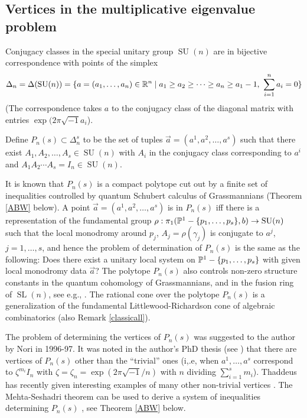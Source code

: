 \documentclass[11pt]{amsart}
\numberwithin{theorem}{subsection}
\begin{document}
\subsection{Vertices in the multiplicative eigenvalue problem}\label{partita}
 Conjugacy classes in the special unitary group $\operatorname{SU}(n)$ are in bijective correspondence with points of the simplex
\begin{equation}\label{defD}
\Delta_n=\Delta(\operatorname{SU}(n))=\{{a}=(a_1,\dots,a_n)\in \Bbb{R}^n\mid  a_1\geq a_2\geq\dots \geq a_n\geq a_1-1,\  \sum_{i=1}^n a_i=0\}
\end{equation}
(The correspondence takes $a$ to the conjugacy class of the diagonal matrix with entries $\exp(2\pi \sqrt{-1}a_i$).

Define $P_n(s)\subset \Delta_n^s$ to be the set of tuples  $\vec{a}=(a^1,a^2,\dots,a^s)$ such that there exist $A_{1}, A_{2}, \dots, A_{s}\in \operatorname{SU}(n)$ with $A_{i}$ in the conjugacy class corresponding to $a^i$ and
$A_{1}A_{2}\cdots A_{s}=I_n\in  \operatorname{SU}(n).$

It is known that $P_n(s)$ is a compact polytope cut out by a finite set of inequalities controlled by quantum Schubert calculus of Grassmannians (Theorem \ref{ABW} below).  A point $\vec{a}=(a^1,a^2,\dots,a^s)$ is in $P_n(s)$ iff there is a representation of the fundamental group $\rho:\pi_1(\Bbb{P}^1-\{p_1,\dots,p_s\},b)\to\operatorname{SU}(n)$ such that the local monodromy around $p_j$, $A_{j}=\rho(\gamma_{j})$ is conjugate to $a^j$, $j=1,\dots,s$, and hence the problem  of determination of $P_n(s)$ is the same as the following: Does there exist a unitary local system on $\Bbb{P}^1-\{p_1,\dots,p_s\}$ with given local monodromy data $\vec{a}$? The polytope $P_n(s)$ also controls non-zero structure constants in the quantum cohomology of Grassmannians, and in the fusion ring of $\operatorname{SL}(n)$, see e.g., \cite{BHorn}. The rational cone over the polytope $P_n(s)$ is a generalization of the fundamental Littlewood-Richardson cone of algebraic combinatorics \cite{FBull,Z} (also Remark \ref{classicall}).


 The problem of determining the vertices of $P_n(s)$ was suggested to the author by Nori in 1996-97. It was noted in the author's PhD thesis (see \cite[Section 7]{BLocal}) that there are vertices of $P_n(s)$ other than the ``trivial'' ones (i,.e,  when $a^1,\dots,a^s$ correspond to $\zeta^{m_i} I_n$ with $\zeta=\zeta_n=\exp(2\pi\sqrt{-1}/n)$  with $n$ dividing $\sum_{i=1}^s m_i$). Thaddeus has  recently given interesting examples of many other non-trivial vertices \cite{thaddy}. The Mehta-Seshadri theorem \cite{MS}  can be used to derive a system of inequalities
 determining $P_n(s)$ \cite{Biswas,AW,BLocal}, see Theorem \ref{ABW} below.
\end{document}
